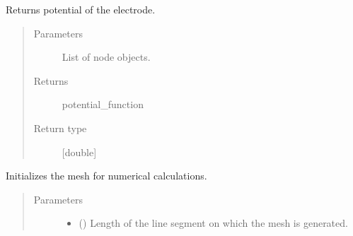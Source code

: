 \documentclass[letterpaper,10pt,english]{sphinxmanual}
\begin{document}
\begin{fulllineitems}
\begin{fulllineitems}
\begin{quote}
\begin{description}
\end{description}\end{quote}

\end{fulllineitems}


\begin{fulllineitems}
\label{\detokenize{electrode:electrode.Electrode.electrode_potential}}
\sphinxAtStartPar
Returns potential of the electrode.
\begin{quote}\begin{description}
\item[{Parameters}] \leavevmode
\sphinxAtStartPar
{} \textendash{} List of node objects.

\item[{Returns}] \leavevmode
\sphinxAtStartPar
potential\_function

\item[{Return type}] \leavevmode
\sphinxAtStartPar
{[}double{]}

\end{description}\end{quote}

\end{fulllineitems}


\begin{fulllineitems}
\label{\detokenize{electrode:electrode.Electrode.mesh_initialize}}
\sphinxAtStartPar
Initializes the mesh for numerical calculations.
\begin{quote}\begin{description}
\item[{Parameters}] \leavevmode\begin{itemize}
\item {} 
\sphinxAtStartPar
{} (\sphinxstyleliteralemphasis{\sphinxupquote{{[}}}\sphinxstyleliteralemphasis{\sphinxupquote{{]}}}) \textendash{} Length of the line segment on which the mesh is generated.


\end{itemize}
\end{description}
\end{quote}
\end{fulllineitems}
\end{fulllineitems}
\end{document}
